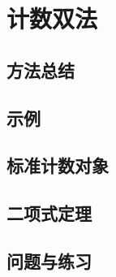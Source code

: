 \section{计数双法}

\subsection{方法总结}

\subsection{示例}

\subsection{标准计数对象}

\subsection{二项式定理}\label{sec:section8.4.4}

\subsection{问题与练习}
